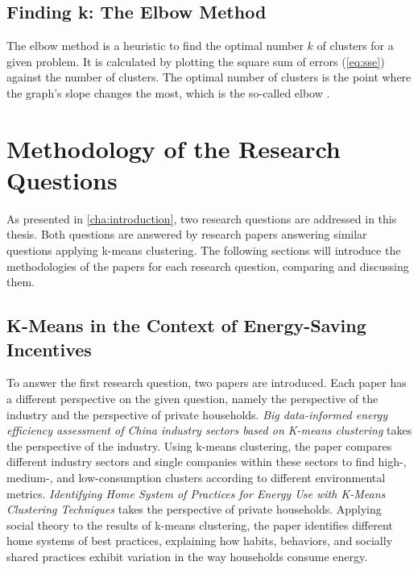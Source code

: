 \subsection{Finding k: The Elbow Method}
The elbow method is a heuristic to find the optimal number $k$ of clusters for a given problem.
It is calculated by plotting the square sum of errors (\autoref{eq:sse}) against the number of clusters.
The optimal number of clusters is the point where the graph's slope changes the most, which is the so-called elbow \cite{SYA-IKC}.

\section{Methodology of the Research Questions}
As presented in \autoref{cha:introduction}, two research questions are addressed in this thesis.
Both questions are answered by research papers answering similar questions applying k-means clustering.
The following sections will introduce the methodologies of the papers for each research question, comparing and discussing them.

\subsection{K-Means in the Context of Energy-Saving Incentives}
To answer the first research question, two papers are introduced.
Each paper has a different perspective on the given question, namely the perspective of the industry and the perspective of private households.
\textit{Big data-informed energy efficiency assessment of China industry sectors based on K-means clustering} \cite{LIU-BDE} takes the perspective of the industry.
Using k-means clustering, the paper compares different industry sectors and single companies within these sectors to find high-, medium-, and low-consumption clusters according to different environmental metrics.
\textit{Identifying Home System of Practices for Energy Use with K-Means Clustering Techniques} \cite{MAL-HBP} takes the perspective of private households.
Applying social theory to the results of k-means clustering, the paper identifies different home systems of best practices, explaining how habits, behaviors, and socially shared practices exhibit variation in the way households consume energy.

